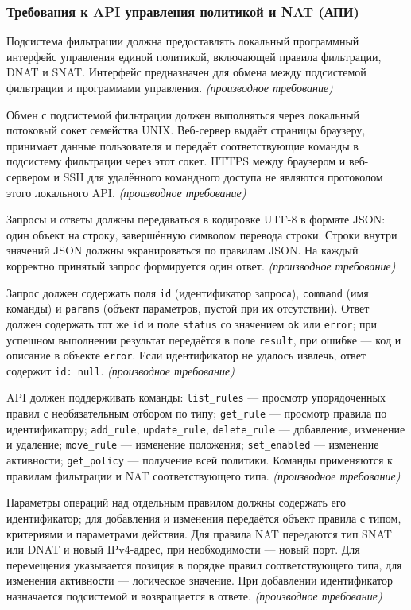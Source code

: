 \documentclass[12pt,a4paper,final]{article}
\newenvironment{reqs}
  {\begin{description}[style=sameline,leftmargin=2.2cm,labelwidth=2.0cm,
     labelsep=0.2cm,font=\normalfont\bfseries,itemsep=3pt]}
  {\end{description}}
\newcommand{\der}{\textit{(производное требование)}}
\begin{document}
 
\subsubsection{Требования к API управления политикой и NAT (АПИ)}
\begin{reqs}
\item[АПИ-01] Подсистема фильтрации должна предоставлять локальный программный интерфейс управления единой политикой, включающей правила фильтрации, DNAT и SNAT. Интерфейс предназначен для обмена между подсистемой фильтрации и программами управления. \der
\item[АПИ-02] Обмен с подсистемой фильтрации должен выполняться через локальный потоковый сокет семейства UNIX. Веб-сервер выдаёт страницы браузеру, принимает данные пользователя и передаёт соответствующие команды в подсистему фильтрации через этот сокет. HTTPS между браузером и веб-сервером и SSH для удалённого командного доступа не являются протоколом этого локального API. \der
\item[АПИ-03] Запросы и ответы должны передаваться в кодировке UTF-8 в формате JSON: один объект на строку, завершённую символом перевода строки. Строки внутри значений JSON должны экранироваться по правилам JSON. На каждый корректно принятый запрос формируется один ответ. \der
\item[АПИ-04] Запрос должен содержать поля \texttt{id} (идентификатор запроса), \texttt{command} (имя команды) и \texttt{params} (объект параметров, пустой при их отсутствии). Ответ должен содержать тот же \texttt{id} и поле \texttt{status} со значением \texttt{ok} или \texttt{error}; при успешном выполнении результат передаётся в поле \texttt{result}, при ошибке --- код и описание в объекте \texttt{error}. Если идентификатор не удалось извлечь, ответ содержит \texttt{id: null}. \der
\item[АПИ-05] API должен поддерживать команды: \texttt{list\_rules} --- просмотр упорядоченных правил с необязательным отбором по типу; \texttt{get\_rule} --- просмотр правила по идентификатору; \texttt{add\_rule}, \texttt{update\_rule}, \texttt{delete\_rule} --- добавление, изменение и удаление; \texttt{move\_rule} --- изменение положения; \texttt{set\_enabled} --- изменение активности; \texttt{get\_policy} --- получение всей политики. Команды применяются к правилам фильтрации и NAT соответствующего типа. \der
\item[АПИ-06] Параметры операций над отдельным правилом должны содержать его идентификатор; для добавления и изменения передаётся объект правила с типом, критериями и параметрами действия. Для правила NAT передаются тип SNAT или DNAT и новый IPv4-адрес, при необходимости --- новый порт. Для перемещения указывается позиция в порядке правил соответствующего типа, для изменения активности --- логическое значение. При добавлении идентификатор назначается подсистемой и возвращается в ответе. \der

\end{reqs}
\end{document}
